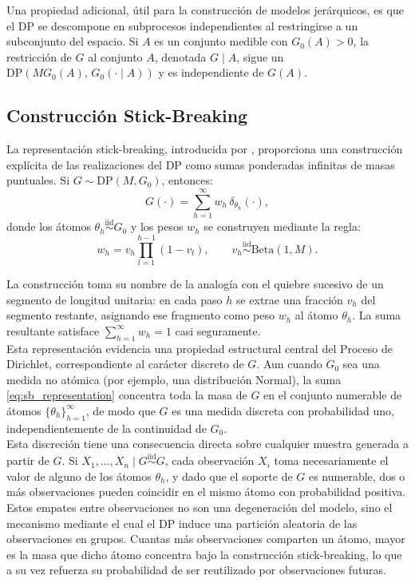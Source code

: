 Una propiedad adicional, útil para la construcción de modelos jerárquicos, es que el DP se descompone en subprocesos independientes al restringirse a un subconjunto del espacio. Si $A$ es un conjunto medible con $G_0(A) > 0$, la restricción de $G$ al conjunto $A$, denotada $G \mid A$, sigue un $\mathrm{DP}(M G_0(A),\, G_0(\cdot \mid A))$ y es independiente de $G(A)$.

\subsection{Construcción Stick-Breaking}
\label{02_04_02_stick_breaking}

La representación stick-breaking, introducida por \cite{02_04_sethuraman1994constructive}, proporciona una construcción explícita de las realizaciones del DP como sumas ponderadas infinitas de masas puntuales. Si $G \sim \mathrm{DP}(M, G_0)$, entonces:
\begin{equation}\label{eq:sb_representation}
    G(\cdot) = \sum_{h=1}^{\infty} w_h\, \delta_{\theta_h}(\cdot),
\end{equation}
donde los átomos $\theta_h \overset{\mathrm{iid}}{\sim} G_0$ y los pesos $w_h$ se construyen mediante la regla:
\begin{equation}\label{eq:02_04_sb_weights}
    w_h = v_h \prod_{l=1}^{h-1}(1 - v_l),
    \qquad v_h \overset{\mathrm{iid}}{\sim} \mathrm{Beta}(1, M).
\end{equation}

La construcción toma su nombre de la analogía con el quiebre sucesivo de un segmento de longitud unitaria: en cada paso $h$ se extrae una fracción $v_h$ del segmento restante, asignando ese fragmento como peso $w_h$ al átomo $\theta_h$. La suma resultante satisface $\sum_{h=1}^{\infty} w_h = 1$ casi seguramente.\\

Esta representación evidencia una propiedad estructural central del Proceso de Dirichlet, correspondiente al carácter discreto de $G$. Aun cuando $G_0$ sea una medida no atómica (por ejemplo, una distribución Normal), la suma \eqref{eq:sb_representation} concentra toda la masa de $G$ en el conjunto numerable de átomos $\{\theta_h\}_{h=1}^{\infty}$, de modo que $G$ es una medida discreta con probabilidad uno, independientemente de la continuidad de $G_0$.\\

Esta discreción tiene una consecuencia directa sobre cualquier muestra generada a partir de $G$. Si $X_1, \dots, X_n \mid G \overset{\mathrm{iid}}{\sim} G$, cada observación $X_i$ toma necesariamente el valor de alguno de los átomos $\theta_h$, y dado que el soporte de $G$ es numerable, dos o más observaciones pueden coincidir en el mismo átomo con probabilidad positiva. Estos empates entre observaciones no son una degeneración del modelo, sino el mecanismo mediante el cual el DP induce una partición aleatoria de las observaciones en grupos. Cuantas más observaciones comparten un átomo, mayor es la masa que dicho átomo concentra bajo la construcción stick-breaking, lo que a su vez refuerza su probabilidad de ser reutilizado por observaciones futuras. 


